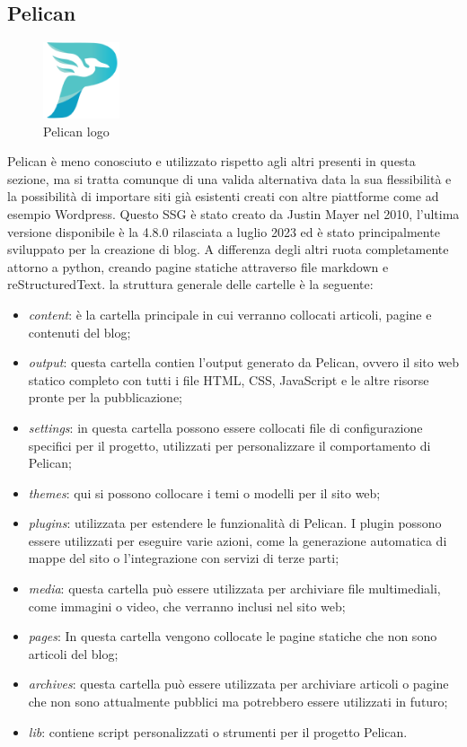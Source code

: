 \documentclass[target=bach,aauheader=]{thud}
\begin{document}
\subsection{Pelican}

\begin{figure}
    \centering
    \includegraphics[width = 0.2\textwidth]{images/pelican_logo.png}
    \caption{Pelican logo}
\end{figure}

Pelican è meno conosciuto e utilizzato rispetto agli altri presenti in questa sezione, ma si tratta comunque di una valida alternativa data la sua flessibilità e la possibilità di importare siti già esistenti creati con altre piattforme come ad esempio Wordpress.
Questo SSG è stato creato da Justin Mayer nel 2010, l'ultima versione disponibile è la 4.8.0 rilasciata a luglio 2023 ed è stato principalmente sviluppato per la creazione di blog.  
A differenza degli altri ruota completamente attorno a python, creando pagine statiche attraverso file markdown e reStructuredText. \newline
la struttura generale delle cartelle è la seguente: 
\begin{itemize}
    \item \textit{content}: è la cartella principale in cui verranno collocati articoli, pagine e contenuti del blog;
    \item \textit{output}: questa cartella contien l'output generato da Pelican, ovvero il sito web statico completo con tutti i file HTML, CSS, JavaScript e le altre risorse pronte per la pubblicazione;
    \item \textit{settings}: in questa cartella possono essere collocati file di configurazione specifici per il progetto, utilizzati per personalizzare il comportamento di Pelican;
    \item \textit{themes}: qui si possono collocare i temi o modelli per il sito web;
    \item \textit{plugins}: utilizzata per estendere le funzionalità di Pelican. I plugin possono essere utilizzati per eseguire varie azioni, come la generazione automatica di mappe del sito o l'integrazione con servizi di terze parti;
    \item \textit{media}: questa cartella può essere utilizzata per archiviare file multimediali, come immagini o video, che verranno inclusi nel sito web;
    \item \textit{pages}: In questa cartella vengono collocate le pagine statiche che non sono articoli del blog;
    \item \textit{archives}: questa cartella può essere utilizzata per archiviare articoli o pagine che non sono attualmente pubblici ma potrebbero essere utilizzati in futuro;
    \item \textit{lib}: contiene script personalizzati o strumenti per il progetto Pelican.
\end{itemize}
\end{document}
